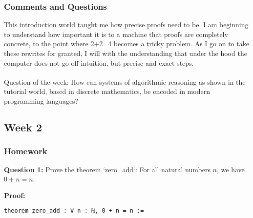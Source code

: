\documentclass{article}
\theoremstyle{theorem}
\theoremstyle{definition}
\theoremstyle{remark}
\begin{document}
{%

%
%

\subsubsection*{Comments and Questions}

This introduction world taught me how precise proofs need to be. I am beginning to understand how important it is to a machine that proofs are completely concrete, to the point where 2+2=4 becomes a tricky problem. As I go on to take these rewrites for granted, I will with the understanding that under the hood the computer does not go off intuition, but precise and exact steps. \\\\
 Question of the week:
How can systems of algorithmic reasoning as shown in the tutorial world, based in discrete mathematics, be encoded in modern programming languages?

\subsection{Week 2}


\subsubsection*{Homework}

\textbf{Question 1:} Prove the theorem `zero\_add`: For all natural numbers \( n \), we have \( 0 + n = n \).

\textbf{Proof:}
\begin{verbatim}
theorem zero_add : ∀ n : ℕ, 0 + n = n :=


\end{verbatim}}
\end{document}
